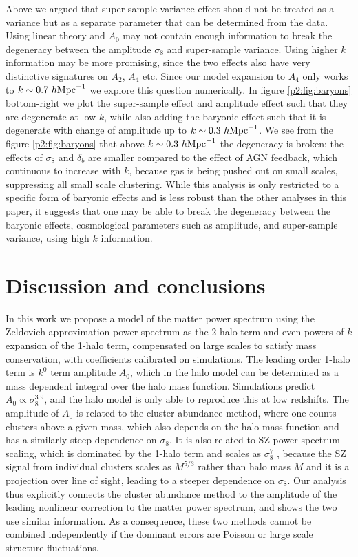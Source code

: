 \documentclass[
  11pt,
  twoside,
  openright,
  titlepage,
  headings=optiontoheadandtoc
]{scrbook}
\begin{document}
Above we argued that super-sample variance effect should not be treated as a variance but as a separate 
parameter that can be determined from the data. Using linear theory and $A_0$ may not contain enough information 
to break the degeneracy between the amplitude $\sigma_8$ and super-sample variance. Using higher $k$ information may be 
more promising, since the two effects also have very distinctive signatures on $A_2$, $A_4$ etc. Since our 
model expansion to $A_4$ only works to $k \sim 0.7\ h \rm{Mpc}^{-1}$ we explore this question numerically. 
In figure \ref{p2:fig:baryons} bottom-right we plot the 
super-sample effect and amplitude effect such that they are degenerate at low $k$, while also adding the
baryonic effect 
such that it is degenerate with change of amplitude up to $k \sim 0.3\ h \rm{Mpc}^{-1}$. 
We see from the figure \ref{p2:fig:baryons} that above $k \sim 0.3\ h \rm{Mpc}^{-1}$ 
the degeneracy is broken: the effects of $\sigma_8$ and $\delta_b$ are smaller compared to 
the effect of AGN 
feedback, which
continuous to increase with $k$, because gas is being pushed out on small scales, suppressing all small 
scale clustering. While this analysis is only restricted to a specific form of baryonic effects and is less robust 
than the other analyses in this paper, it suggests that one may be able to break the degeneracy between the 
baryonic effects, cosmological parameters such as amplitude, and super-sample variance, using high $k$ information. 


\section{Discussion and conclusions}\label{p2:sec:discussion}

In this work we propose a model of the matter power spectrum using the Zeldovich approximation
power spectrum as the 2-halo term and even powers of $k$ expansion of the 1-halo term, compensated 
on large scales to satisfy mass conservation, with coefficients 
calibrated on simulations. The leading order 1-halo term is $k^0$ term amplitude $A_0$, which
in the halo model can be determined as a mass dependent integral over the halo mass function.
Simulations predict $A_0 \propto \sigma_8^{3.9}$, and the halo model is only able to reproduce this at low 
redshifts. 
The amplitude of $A_0$ is related to the cluster 
abundance method, where one counts clusters above a given mass, which also depends on the halo mass
function and has a similarly 
steep dependence on $\sigma_8$. It is also related to SZ power spectrum 
scaling, which is dominated by the 1-halo term and scales
as $\sigma_8^7$ \citep{2002MNRAS.336.1256K}, because the SZ signal from individual clusters 
scales as $M^{5/3}$ rather than 
halo mass $M$ and it is a projection over line of sight, leading to a steeper dependence on $\sigma_8$.
Our analysis thus explicitly connects the cluster abundance method to the amplitude of the leading nonlinear 
correction to the matter power spectrum, and shows the two use similar information. As a consequence, these two 
methods cannot be combined independently if the dominant errors are Poisson or large scale structure fluctuations. 
\end{document}
